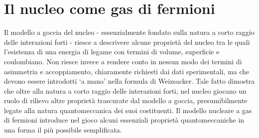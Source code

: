 \section{Il nucleo come gas di fermioni}\label{sec:il-nucleo-come-gas-di-fermioni}

Il modello a goccia del nucleo - essenzialmente fondato sulla natura a corto raggio delle interazioni forti - riesce a
descrivere alcune proprietà del nucleo tra le quali l’esistenza di una energia di legame con termini di volume, superficie e coulombiano.
Non riesce invece a rendere conto in nessun modo dei termini di asimmetria e accoppiamento, chiaramente richiesti dai
dati sperimentali, ma che devono essere introdotti ‘a mano’ nella formula di Weizsacker.
Tale fatto dimostra che oltre alla natura a corto raggio delle interazioni forti, nel nucleo giocano un ruolo di rilievo
altre proprietà trascurate dal modello a goccia, presumibilmente legate alla natura quantomeccanica dei suoi costituenti.
Il modello nucleare a gas di fermioni introduce nel gioco alcuni essenziali proprietà quantomeccaniche in una forma il
più possibile semplificata.





